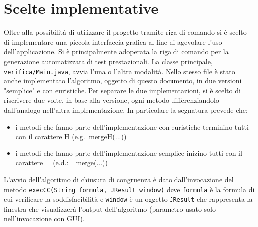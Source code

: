\documentclass[a4paper,11pt]{article}
\begin{document}
\section{Scelte implementative}
Oltre alla possibilità di utilizzare il progetto tramite riga di comando si è scelto di implementare una piccola interfaccia grafica al fine di agevolare l'uso dell'applicazione.
Si è principalmente adoperata la riga di comando per la generazione automatizzata di test prestazionali.
La classe principale, {\tt verifica/Main.java}, avvia l'una o l'altra modalità.
Nello stesso file è stato anche implementato l'algoritmo, oggetto di questo documento, in due versioni "semplice" e con euristiche.
Per separare le due implementazioni, si è scelto di riscrivere due volte, in base alla versione, ogni metodo differenziandolo dall'analogo nell'altra implementazione.
In particolare la segnatura prevede che:
\begin{itemize}
	\item i metodi che fanno parte dell'implementazione con euristiche terminino tutti con il carattere H (e.g.: mergeH(...))
	\item i metodi che fanno parte dell'implementazione semplice inizino tutti con il carattere \_ (e.d.: \_merge(...))
\end{itemize}
L'avvio dell'algoritmo di chiusura di congruenza è dato dall'invocazione del metodo  
{\tt execCC(String formula, JResult window)}
dove {\tt formula} è la formula di cui verificare la soddisfacibilità e {\tt window} è un oggetto {\tt JResult} che rappresenta la finestra che visualizzerà l'output dell'algoritmo (parametro usato solo nell'invocazione con GUI).
\end{document}
